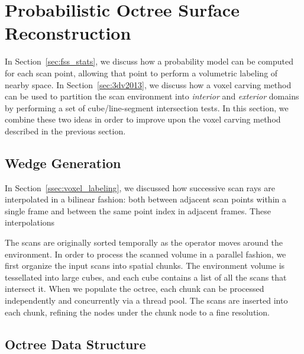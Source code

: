 \documentclass[12pt,onecolumn,oneside]{book}
\begin{document}
\section{Probabilistic Octree Surface Reconstruction}
\label{sec:procarve}

In Section~\ref{sec:fss_stats}, we discuss how a probability model can be computed for each scan point, allowing that point to perform a volumetric labeling of nearby space.  In Section~\ref{sec:3dv2013}, we discuss how a voxel carving method can be used to partition the scan environment into {\it interior} and {\it exterior} domains by performing a set of cube/line-segment intersection tests.  In this section, we combine these two ideas in order to improve upon the voxel carving method described in the previous section.

\subsection{Wedge Generation}
\label{ssec:procarve_wedge_and_chunk}

In Section~\ref{ssec:voxel_labeling}, we discussed how successive scan rays are interpolated in a bilinear fashion:  both between adjacent scan points within a single frame and between the same point index in adjacent frames.  These interpolations 

The scans are originally sorted temporally as the operator moves around the environment.  In order to process the scanned volume in a parallel fashion, we first organize the input scans into spatial chunks.  The environment volume is tessellated into large cubes, and each cube contains a list of all the scans that intersect it.  When we populate the octree, each chunk can be processed independently and concurrently via a thread pool.  The scans are inserted into each chunk, refining the nodes under the chunk node to a fine resolution.  

\subsection{Octree Data Structure}
\label{ssec:procarve_octree}

\end{document}
